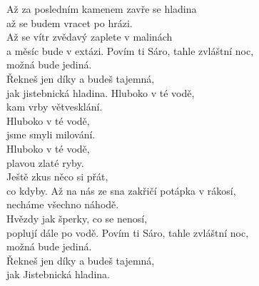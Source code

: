 \ve
{}Až za posledním kamenem zavře se hladina\\
až se budem vracet po hrázi.\\
Až se vítr zvědavý zaplete v malinách\\
a měsíc bude v extázi.
\ve
Povím ti Sáro, tahle zvláštní noc,\\
možná bude jediná.\\
Řekneš jen díky a budeš tajemná,\\
jak jistebnická hladina.
\cho
{}Hluboko v té vodě,\\
kam vrby větvesklání.\\
Hluboko v té vodě,\\
jsme smyli milování.\\
Hluboko v té vodě,\\
plavou zlaté ryby.\\
Ještě zkus něco si přát,\\
co kdyby.
\ve
Až na nás ze sna zakřičí potápka v rákosí,\\
necháme všechno náhodě.\\
Hvězdy jak šperky, co se nenosí,\\
poplují dále po vodě.
\ve
Povím ti Sáro, tahle zvláštní noc,\\
možná bude jediná.\\
Řekneš jen díky a budeš tajemná,\\
jak Jistebnická hladina.
\esong
